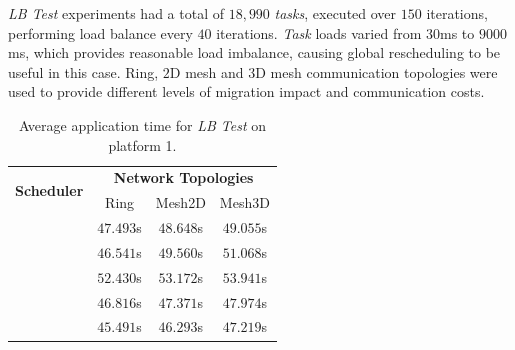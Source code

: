 \textit{LB Test} experiments had a total of $18,990$ \textit{tasks}, executed over $150$ iterations, performing load balance every $40$ iterations.
\textit{Task} loads varied from $30$ms to $9000$ms, which provides reasonable load imbalance, causing global rescheduling to be useful in this case.
Ring, $2$D mesh and $3$D mesh communication topologies were used to provide different levels of migration impact and communication costs.


\begin{table}[h]
	\centering
    \caption{Average application time for \textit{LB Test} on platform 1.}
	\begin{tabular}{l  c  c  c}
    	\toprule
	\multirow{2}{*}{\textbf{Scheduler}} 	& \multicolumn{3}{c}{\textbf{Network Topologies}} \\ \cmidrule{2-4}
 								& Ring & Mesh2D & Mesh3D \\
	\midrule
        \distributedlb 		& $47.493$s & $48.648$s & $49.055$s \\
        \greedylb 			& $46.541$s & $49.560$s & $51.068$s \\
        \dummylb 			& $52.430$s & $53.172$s & $53.941$s \\
        \packdrop 			& $46.816$s & $47.371$s & $47.974$s \\
         			& $45.491$s & $46.293$s & $47.219$s \\
        \bottomrule
	\end{tabular}
    \label{tab:lbtest:apptime}
\end{table}

